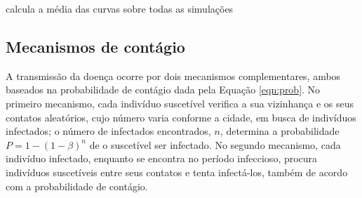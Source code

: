 \documentclass[
	12pt,				%
	openright,			%
	oneside,			%
	a4paper,			%
	english,			%
	french,				%
	spanish,			%
	brazil				%
	]{abntex2}
\begin{document}
\begin{algorithm}[H]
\DontPrintSemicolon
\caption{Laço principal da simulação}
\label{alg:simulacao}
calcula a média das curvas sobre todas as simulações\;
\end{algorithm}

\subsection{Mecanismos de contágio}

A transmissão da doença ocorre por dois mecanismos complementares, ambos baseados na probabilidade de contágio dada pela Equação \ref{eqn:prob}. No primeiro mecanismo, cada indivíduo suscetível verifica a sua vizinhança e os seus contatos aleatórios, cujo número varia conforme a cidade, em busca de indivíduos infectados; o número de infectados encontrados, $n$, determina a probabilidade $P = 1 - (1 - \beta)^n$ de o suscetível ser infectado. No segundo mecanismo, cada indivíduo infectado, enquanto se encontra no período infeccioso, procura indivíduos suscetíveis entre seus contatos e tenta infectá-los, também de acordo com a probabilidade de contágio.
\end{document}
